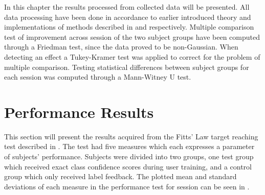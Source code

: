 
In this chapter the results processed from collected data will be presented. All data processing have been done in accordance to earlier introduced theory and implementations of methods described in  and  respectively. Multiple comparison test of improvement across session of the two subject groups have been computed through a Friedman test, since the data proved to be non-Gaussian. When detecting an effect a Tukey-Kramer test was applied to correct for the problem of multiple comparison. Testing statistical differences between subject groups for each session was computed through a Mann-Witney U test. %


\section{Performance Results} \label{sec:R:fitts}
This section will present the results acquired from the Fitts' Law target reaching test described in . The test had five measures which each expresses a parameter of subjects' performance. Subjects were divided into two groups, one test group which received exact class confidence scores during user training, and a control group which only received label feedback. The plotted mean and standard deviations of each measure in the performance test for session can be seen in .

